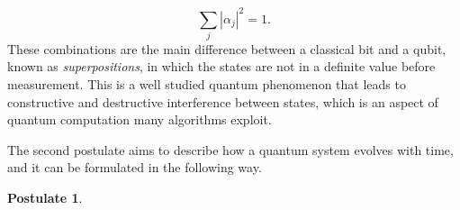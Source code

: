 \documentclass[../../dissertation.tex]{subfiles}
\newtheorem{post}{Postulate}
\begin{document}
\begin{equation}
	\sum_j | \alpha_j |^2 = 1 .
\end{equation}
These combinations are the main difference between a classical bit and a qubit,
known as \textit{superpositions}, in which the states are not in a definite
value before measurement. This is a well studied quantum phenomenon that leads
to constructive and destructive interference between states, which is an aspect
of quantum computation many algorithms exploit.\par
The second postulate aims to describe how a quantum system evolves with time,
and it can be formulated in the following way. 
\begin{post}
	
\end{post}
\end{document}
